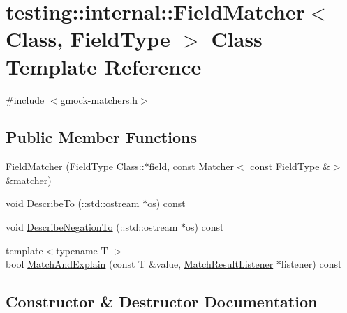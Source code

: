 \hypertarget{classtesting_1_1internal_1_1_field_matcher}{}\section{testing\+:\+:internal\+:\+:Field\+Matcher$<$ Class, Field\+Type $>$ Class Template Reference}
\label{classtesting_1_1internal_1_1_field_matcher}


{\ttfamily \#include $<$gmock-\/matchers.\+h$>$}

\subsection*{Public Member Functions}
\begin{DoxyCompactItemize}
\item 
\hyperlink{classtesting_1_1internal_1_1_field_matcher_a5d20aa34edd41eb898b1f8dd35d585f5}{Field\+Matcher} (Field\+Type Class\+::$\ast$field, const \hyperlink{classtesting_1_1_matcher}{Matcher}$<$ const Field\+Type \&$>$ \&matcher)
\item 
void \hyperlink{classtesting_1_1internal_1_1_field_matcher_af0726e67962870bed9f3b184b3edb22e}{Describe\+To} (\+::std\+::ostream $\ast$os) const
\item 
void \hyperlink{classtesting_1_1internal_1_1_field_matcher_a3d8eb433d6a765f8d59b3b07704c3d80}{Describe\+Negation\+To} (\+::std\+::ostream $\ast$os) const
\item 
{\footnotesize template$<$typename T $>$ }\\bool \hyperlink{classtesting_1_1internal_1_1_field_matcher_ac0cf950415d64026bc28eb84e6296f1b}{Match\+And\+Explain} (const T \&value, \hyperlink{classtesting_1_1_match_result_listener}{Match\+Result\+Listener} $\ast$listener) const
\end{DoxyCompactItemize}


\subsection{Constructor \& Destructor Documentation}
\mbox{\label{classtesting_1_1internal_1_1_field_matcher_a5d20aa34edd41eb898b1f8dd35d585f5}} 
